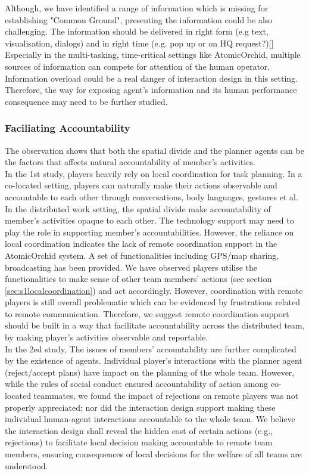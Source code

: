 Although, we have identified a range of information which is missing for establishing "Common Ground", presenting the information could be also challenging. The information should be delivered in right form (e.g text, visualisation, dialogs) and in right time (e.g. pop up or on HQ request?)[] Especially in the multi-tasking, time-critical settings like AtomicOrchid, multiple sources of information can compete for attention of the human operator. Information overload could be a real danger of interaction design in this setting. Therefore, the  way for exposing agent's information and its human performance consequence may need to be further studied.   \\

\subsubsection{Faciliating Accountability}\label{sec:conclusionAC}
The observation shows that both the spatial divide and the planner agents can be the factors that affects natural accountability of member's activities. \\

In the 1st study, players heavily rely on local coordination for task planning. In a co-located setting, players can naturally make their actions observable and accountable to each other through conversations, body languages, gestures et al. In the distributed work setting, the spatial divide make accountability of member's activities opaque to each other. The technology support may need to play the role in supporting member's accountabilities. However, the reliance on local coordination indicates the lack of remote coordination support in the AtomicOrchid system. A set of functionalities including GPS/map sharing, broadcasting has been provided. We have observed players utilise the functionalities to make sense of other team members' actions (see section \ref{sec:s1localcoordination}) and act accordingly. However, coordination with remote players is still overall problematic which can be evidenced by frustrations related to remote communication. Therefore, we suggest remote coordination support should be built in a way that facilitate accountability across the distributed team, by making player's activities observable and reportable.\\

In the 2ed study, The issues of members' accountability are further complicated by the existence of agents. Individual player's interactions with the planner agent (reject/accept plans) have impact on the planning of the whole team. However, while the rules of social conduct ensured accountability of action among co-located teammates, we found the impact of rejections on remote players was not properly appreciated; nor did the interaction design support making these individual human-agent interactions accountable to the whole team. We believe the interaction design shall reveal the hidden cost of certain actions (e.g., rejections) to facilitate local decision making accountable to remote team members, ensuring consequences of local decisions for the welfare of all teams are understood. \\


